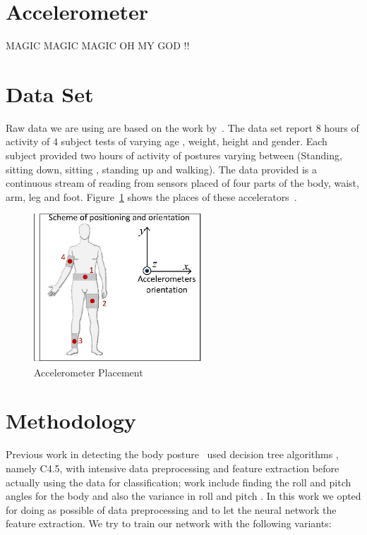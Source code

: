 \documentclass{article}
\begin{document}
\section{Accelerometer}
\label{accelerometer} 
MAGIC MAGIC MAGIC OH MY GOD !!

\section{Data Set}
\label{DataSet}

Raw data we are using are based on the work by~\cite{ugulino2012wearable}. The data set report 8 hours of activity of 4 subject tests 
of varying age , weight, height and gender. Each subject provided two hours of activity of postures varying between (Standing,
sitting down, sitting , standing up and walking). The data provided is a continuous stream of reading from sensors placed of four 
parts of the body, waist, arm, leg and foot. Figure~\ref{acc_placement} shows the places of these accelerators~\cite{ugulino2012wearable}. 


\begin{figure}[h]
\centering
\includegraphics[width=2.5in]{acc_placement}
\caption{Accelerometer Placement}
\label{acc_placement}
\end{figure}
 

\section{Methodology}
\label{meth}

Previous work in detecting the body posture~\cite{ugulino2012wearable} used decision tree algorithms , namely C4.5,  with intensive 
data preprocessing and feature extraction before actually using the data for classification; work include finding the roll and 
pitch angles for the body and also the variance in roll and pitch . In this work we opted for doing as possible of data preprocessing
and to let the neural network the feature extraction. We try to train our network with the following variants:
\end{document}
